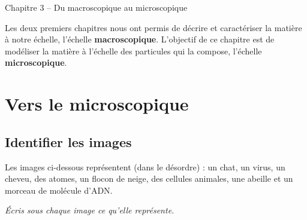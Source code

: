 \documentclass[12pt,a4paper]{article}
\begin{document}
\begin{header}
Chapitre 3 -- Du macroscopique au microscopique
\end{header}

Les deux premiers chapitres nous ont permis de décrire et caractériser la matière à notre échelle, l'échelle \textbf{macroscopique}.
L'objectif de ce chapitre est de modéliser la matière à l'échelle des particules qui la compose, l'échelle \textbf{microscopique}.

\section{Vers le microscopique}

\subsection{Identifier les images}

Les images ci-dessous représentent (dans le désordre) : un chat, un virus, un cheveu, des atomes, un flocon de neige, des cellules animales, une abeille et un morceau de molécule d'ADN.

\emph{Écris sous chaque image ce qu'elle représente.}
\end{document}
